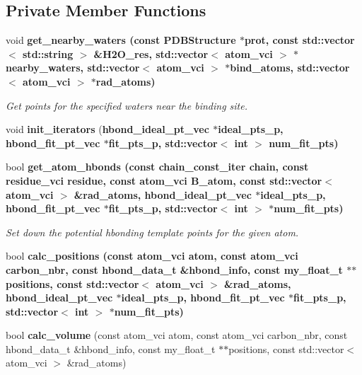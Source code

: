 \subsection*{Private Member Functions}
\begin{CompactItemize}
\item 
void \bf{get\_\-nearby\_\-waters} (const \bf{PDBStructure} $\ast$prot, const std::vector$<$ std::string $>$ \&H2O\_\-res, std::vector$<$ atom\_\-vci $>$ $\ast$nearby\_\-waters, std::vector$<$ atom\_\-vci $>$ $\ast$bind\_\-atoms, std::vector$<$ atom\_\-vci $>$ $\ast$rad\_\-atoms)
\begin{CompactList}\small\item\em Get points for the specified waters near the binding site. \item\end{CompactList}\item 
void \textbf{init\_\-iterators} (\bf{hbond\_\-ideal\_\-pt\_\-vec} $\ast$ideal\_\-pts\_\-p, \bf{hbond\_\-fit\_\-pt\_\-vec} $\ast$fit\_\-pts\_\-p, std::vector$<$ int $>$ num\_\-fit\_\-pts)\label{classSimSite3D_1_1HbondPoints_7409a5ed54b6b5a1091ec470222d8fff}

\item 
bool \bf{get\_\-atom\_\-hbonds} (const chain\_\-const\_\-iter chain, const residue\_\-vci residue, const atom\_\-vci B\_\-atom, const std::vector$<$ atom\_\-vci $>$ \&rad\_\-atoms, \bf{hbond\_\-ideal\_\-pt\_\-vec} $\ast$ideal\_\-pts\_\-p, \bf{hbond\_\-fit\_\-pt\_\-vec} $\ast$fit\_\-pts\_\-p, std::vector$<$ int $>$ $\ast$num\_\-fit\_\-pts)
\begin{CompactList}\small\item\em Set down the potential hbonding template points for the given atom. \item\end{CompactList}\item 
bool \bf{calc\_\-positions} (const atom\_\-vci atom, const atom\_\-vci carbon\_\-nbr, const hbond\_\-data\_\-t \&hbond\_\-info, const my\_\-float\_\-t $\ast$$\ast$positions, const std::vector$<$ atom\_\-vci $>$ \&rad\_\-atoms, \bf{hbond\_\-ideal\_\-pt\_\-vec} $\ast$ideal\_\-pts\_\-p, \bf{hbond\_\-fit\_\-pt\_\-vec} $\ast$fit\_\-pts\_\-p, std::vector$<$ int $>$ $\ast$num\_\-fit\_\-pts)
\item 
bool \textbf{calc\_\-volume} (const atom\_\-vci atom, const atom\_\-vci carbon\_\-nbr, const hbond\_\-data\_\-t \&hbond\_\-info, const my\_\-float\_\-t $\ast$$\ast$positions, const std::vector$<$ atom\_\-vci $>$ \&rad\_\-atoms)\label{classSimSite3D_1_1HbondPoints_68b193317365c110b4f395b82f918ec5}


\end{CompactItemize}
